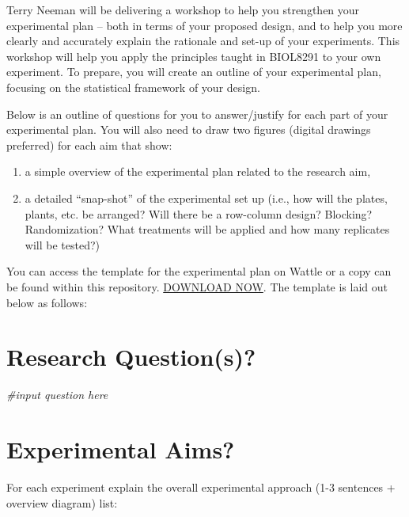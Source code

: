 \documentclass[
]{book}
\newenvironment{Shaded}{\begin{snugshade}}{\end{snugshade}}
\newcommand{\CommentTok}[1]{\textcolor[rgb]{0.56,0.35,0.01}{\textit{#1}}}
\providecommand{\tightlist}{%
  \setlength{\itemsep}{0pt}\setlength{\parskip}{0pt}}
\begin{document}
Terry Neeman will be delivering a workshop to help you strengthen your experimental plan -- both in terms of your proposed design, and to help you more clearly and accurately explain the rationale and set-up of your experiments. This workshop will help you apply the principles taught in BIOL8291 to your own experiment. To prepare, you will create an outline of your experimental plan, focusing on the statistical framework of your design.

Below is an outline of questions for you to answer/justify for each part of your experimental plan. You will also need to draw two figures (digital drawings preferred) for each aim that show:

\begin{enumerate}
\def\labelenumi{\arabic{enumi})}
\tightlist
\item
  a simple overview of the experimental plan related to the research aim,
\item
  a detailed ``snap-shot'' of the experimental set up (i.e., how will the plates, plants, etc. be arranged? Will there be a row-column design? Blocking? Randomization? What treatments will be applied and how many replicates will be tested?)
\end{enumerate}

You can access the template for the experimental plan on Wattle or a copy can be found within this repository. \href{\%223.\%20Statistical\%20Methods\%20in\%20Biology\%20-\%20Chapter\%203.pdf\%22}{DOWNLOAD NOW}. The template is laid out below as follows:

\hypertarget{research-questions}{%
\section{Research Question(s)?}\label{research-questions}}

\begin{Shaded}
\begin{Highlighting}[]
\CommentTok{\#input question here}
\end{Highlighting}
\end{Shaded}

\hypertarget{experimental-aims}{%
\section{Experimental Aims?}\label{experimental-aims}}

For each experiment explain the overall experimental approach (1-3 sentences + overview diagram) list:
\end{document}
